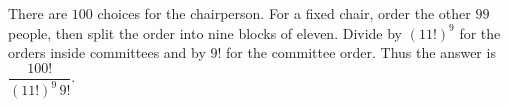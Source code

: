 There are $100$ choices for the chairperson. For a fixed chair, order the other $99$ people, then split the order into nine blocks of eleven. Divide by $(11!)^9$ for the orders inside committees and by $9!$ for the committee order. Thus the answer is $\boxed{\dfrac{100!}{(11!)^9\,9!}}$.
